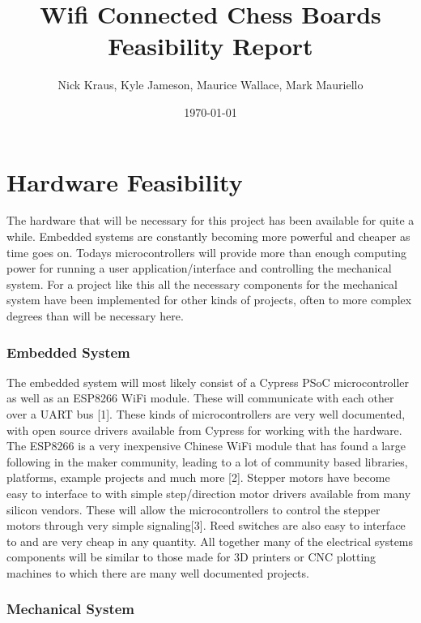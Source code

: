 \documentclass{article}
\title{Wifi Connected Chess Boards \\ \large Feasibility Report}
\author{Nick Kraus, Kyle Jameson, Maurice Wallace, Mark Mauriello}
\date{\today}
\begin{document}
\maketitle


\section*{Hardware Feasibility}
\indent

The hardware that will be necessary for this project has been available for quite a while. Embedded systems are constantly becoming more powerful and cheaper as time goes on. Todays microcontrollers will provide more than enough computing power for running a user application/interface and controlling the mechanical system. For a project like this all the necessary components for the mechanical system have been implemented for other kinds of projects, often to more complex degrees than will be necessary here.

\subsubsection*{Embedded System}
\indent

The embedded system will most likely consist of a Cypress PSoC microcontroller as well as an ESP8266 WiFi module. These will communicate with each other over a UART bus [1]. These kinds of microcontrollers are very well documented, with open source drivers available from Cypress for working with the hardware. The ESP8266 is a very inexpensive Chinese WiFi module that has found a large following in the maker community, leading to a lot of community based libraries, platforms, example projects and much more [2]. Stepper motors have become easy to interface to with simple step/direction motor drivers available from many silicon vendors. These will allow the microcontrollers to control the stepper motors through very simple signaling[3]. Reed switches are also easy to interface to and are very cheap in any quantity. All together many of the electrical systems components will be similar to those made for 3D printers or CNC plotting machines to which there are many well documented projects.

\subsubsection*{Mechanical System}
\indent
\end{document}

